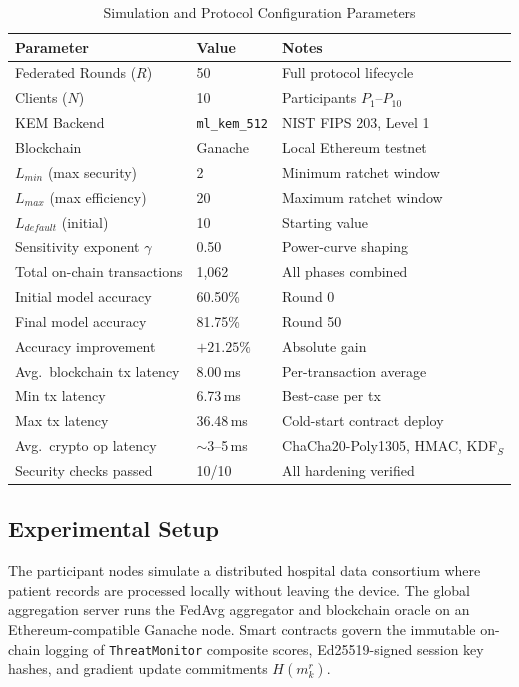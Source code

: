 \documentclass[journal, 10pt, twocolumn]{IEEEtran}
\begin{document}
\begin{table}[H]
\centering
\caption{Simulation and Protocol Configuration Parameters}
\label{tab:sim_params}
\begin{tabular}{l l l}
\toprule
\textbf{Parameter} & \textbf{Value} & \textbf{Notes} \\
\midrule
Federated Rounds ($R$)             & 50              & Full protocol lifecycle \\
Clients ($N$)                      & 10              & Participants $P_1$--$P_{10}$ \\
KEM Backend                        & \texttt{ml\_kem\_512}   & NIST FIPS 203, Level 1 \\
Blockchain                         & Ganache         & Local Ethereum testnet \\
$L_{min}$ (max security)           & 2               & Minimum ratchet window \\
$L_{max}$ (max efficiency)         & 20              & Maximum ratchet window \\
$L_{default}$ (initial)            & 10              & Starting value \\
Sensitivity exponent $\gamma$      & 0.50            & Power-curve shaping \\
Total on-chain transactions        & 1,062           & All phases combined \\
Initial model accuracy             & 60.50\%         & Round 0 \\
Final model accuracy               & 81.75\%         & Round 50 \\
Accuracy improvement               & $+21.25\%$      & Absolute gain \\
Avg.\ blockchain tx latency        & 8.00\,ms        & Per-transaction average \\
Min tx latency                     & 6.73\,ms        & Best-case per tx \\
Max tx latency                     & 36.48\,ms       & Cold-start contract deploy \\
Avg.\ crypto op latency            & $\sim$3--5\,ms  & ChaCha20-Poly1305, HMAC, KDF$_S$ \\
Security checks passed             & 10/10           & All hardening verified \\
\bottomrule
\end{tabular}
\end{table}

\subsection{Experimental Setup}
The participant nodes simulate a distributed hospital data consortium where patient records are processed locally without leaving the device. The global aggregation server runs the FedAvg aggregator and blockchain oracle on an Ethereum-compatible Ganache node. Smart contracts govern the immutable on-chain logging of \texttt{ThreatMonitor} composite scores, Ed25519-signed session key hashes, and gradient update commitments $H(m_k^r)$.
\end{document}
